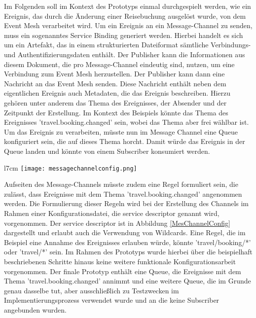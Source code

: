   Im Folgenden soll im Kontext des Prototyps einmal durchgespielt werden, wie ein Ereignis, das durch die Änderung einer Reisebuchung ausgelöst wurde, von dem Event Mesh verarbeitet wird. Um ein Ereignis an ein Message-Channel zu senden, muss ein sogenanntes Service Binding generiert werden. Hierbei handelt es sich um ein Artefakt, 
  das in einem strukturierten Dateiformat sämtliche Verbindungs- und Authentifizierungsdaten enthält. Der Publisher kann die Informationen aus diesem Dokument, die pro Message-Channel eindeutig sind, nutzen, um eine Verbindung zum Event Mesh herzustellen. Der Publisher kann dann eine Nachricht an das Event Mesh senden. Diese Nachricht enthält neben dem eigentlichen Ereignis auch Metadaten, die das Ereignis beschreiben.  
  Hierzu gehören unter anderem das Thema des Ereignisses, der Absender und der Zeitpunkt der Erstellung. Im Kontext des Beispiels könnte das Thema des Ereignisses 'travel.booking.changed' sein, wobei das Thema aber frei wählbar ist. Um das Ereignis zu verarbeiten, müsste nun im Message Channel eine Queue konfiguriert sein, die auf dieses Thema horcht. Damit würde das Ereignis in der Queue landen und könnte von einem Subscriber konsumiert werden. 
  \begin{wrapfigure}{l}{7cm}
  \centering
  \texttt{[image: messagechannelconfig.png]}
  \caption[Regeln für die Konfiguration des Message-Channels]{Regeln für die Konfiguration des Message-Channels \footnotemark}
  \label{MesChannelConfig}
\end{wrapfigure}
  Aufseiten des Message-Channels müsste zudem eine Regel formuliert sein, die zulässt, dass Ereignisse mit dem Thema 'travel.booking.changed' angenommen werden. Die Formulierung dieser Regeln wird bei der Erstellung des Channels im Rahmen einer Konfigurationsdatei, die service descriptor genannt wird, vorgenommen. Der service descriptor ist in Abbildung \ref{MesChannelConfig} dargestellt und erlaubt auch die Verwendung von Wildcards. Eine Regel, die im Beispiel eine Annahme des Ereignisses erlauben würde, könnte 'travel/booking/*' oder 'travel/*' sein. Im Rahmen des Prototyps wurde hierbei über die beispielhaft beschriebenen Schritte hinaus keine weitere funktionale Konfigurationsarbeit vorgenommen. Der finale Prototyp enthält eine Queue, die Ereignisse mit dem Thema 'travel.booking.changed' annimmt und eine weitere Queue, die im Grunde genau dasselbe tut, aber ausschließlich zu Testzwecken im Implementierungsprozess verwendet wurde und an die keine Subscriber angebunden wurden.\\

